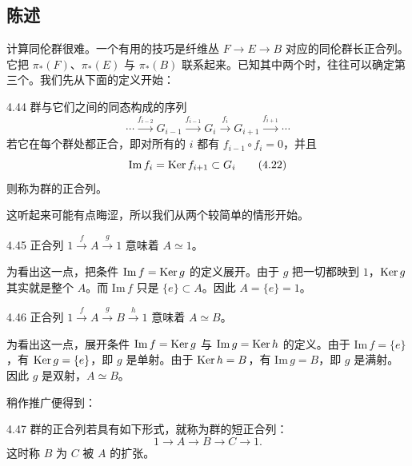 \subsection{陈述}

计算同伦群很难。一个有用的技巧是纤维丛 $F\to E\to B$ 对应的同伦群长正合列。它把 $\pi_\ast(F)$、$\pi_\ast(E)$ 与 $\pi_\ast(B)$ 联系起来。已知其中两个时，往往可以确定第三个。我们先从下面的定义开始：

\begin{definition}{4.44}
群与它们之间的同态构成的序列
\begin{equation}
\cdots\xrightarrow{f_{i-2}}G_{i-1}\xrightarrow{f_{i-1}}G_i\xrightarrow{f_i}G_{i+1}\xrightarrow{f_{i+1}}\cdots
\tag{4.21}
\end{equation}
若它在每个群处都正合，即对所有的 $i$ 都有 $f_{i-1}\circ f_i=0$，并且
\begin{equation}
\mathrm{Im}\,f_i=\operatorname{Ker} f_{i+1}\subset G_i
\tag{4.22}
\end{equation}
则称为群的正合列。
\end{definition}

这听起来可能有点晦涩，所以我们从两个较简单的情形开始。

\begin{proposition}{4.45}
正合列 $1\xrightarrow{f}A\xrightarrow{g}1$ 意味着 $A\simeq 1$。
\end{proposition}

为看出这一点，把条件 $\mathrm{Im}\,f=\operatorname{Ker} g$ 的定义展开。由于 $g$ 把一切都映到 $1$，$\operatorname{Ker} g$ 其实就是整个 $A$。而 $\mathrm{Im}\,f$ 只是 $\{e\}\subset A$。因此 $A=\{e\}=1$。

\begin{proposition}{4.46}
正合列 $1\xrightarrow{f}A\xrightarrow{g}B\xrightarrow{h}1$ 意味着 $A\simeq B$。
\end{proposition}

为看出这一点，展开条件 $\mathrm{Im}\,f=\operatorname{Ker} g$ 与 $\mathrm{Im}\,g=\operatorname{Ker} h$ 的定义。由于 $\mathrm{Im}\,f=\{e\}$，有 $\operatorname{Ker} g=\{e\}$，即 $g$ 是单射。由于 $\operatorname{Ker} h=B$，有 $\mathrm{Im}\,g=B$，即 $g$ 是满射。因此 $g$ 是双射，$A\simeq B$。

稍作推广便得到：

\begin{definition}{4.47}
群的正合列若具有如下形式，就称为群的短正合列：
\begin{equation}
1\to A\to B\to C\to 1.
\tag{4.23}
\end{equation}
这时称 $B$ 为 $C$ 被 $A$ 的扩张。
\end{definition}

